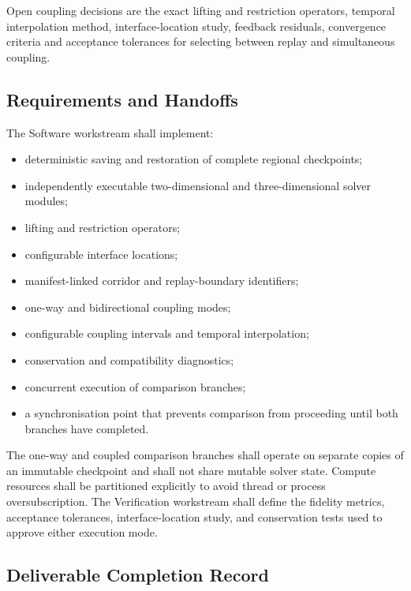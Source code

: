 
Open coupling decisions are the exact lifting and restriction
operators, temporal interpolation method, interface-location study,
feedback residuals, convergence criteria and acceptance tolerances for
selecting between replay and simultaneous coupling.

\subsection{Requirements and Handoffs}
\label{sec:res-mod-mul-requirements}


The Software workstream shall implement:
\begin{itemize}
  \item deterministic saving and restoration of complete regional checkpoints;
  \item independently executable two-dimensional and three-dimensional solver modules;
  \item lifting and restriction operators;
  \item configurable interface locations;
  \item manifest-linked corridor and replay-boundary identifiers;
  \item one-way and bidirectional coupling modes;
  \item configurable coupling intervals and temporal interpolation;
  \item conservation and compatibility diagnostics;
  \item concurrent execution of comparison branches;
  \item a synchronisation point that prevents comparison from proceeding until both branches have completed.
\end{itemize}
The one-way and coupled comparison branches shall operate on separate copies of an immutable checkpoint and shall not share mutable solver state. Compute resources shall be partitioned explicitly to avoid thread or process oversubscription. The Verification workstream shall define the fidelity metrics, acceptance tolerances, interface-location study, and conservation tests used to approve either execution mode.

\subsection{Deliverable Completion Record}
\label{sec:res-mod-mul-completion-record}

%
%
%
